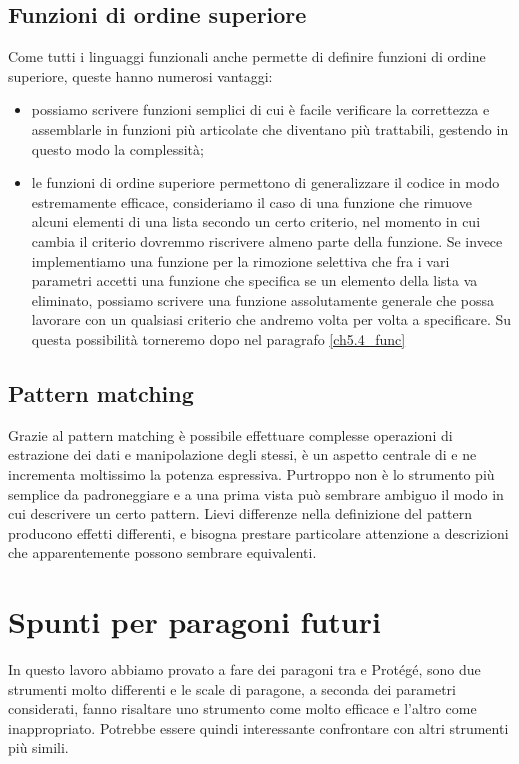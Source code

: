 \subsection{Funzioni di ordine superiore}
Come tutti i linguaggi funzionali anche \cduce permette di definire funzioni di ordine superiore, queste hanno numerosi vantaggi: 
\begin{itemize}
	\item possiamo scrivere funzioni semplici di cui è facile verificare la correttezza e assemblarle in funzioni più articolate che diventano più trattabili, gestendo in questo modo la complessità;
	\item le funzioni di ordine superiore permettono di generalizzare il codice in modo estremamente efficace, consideriamo il caso di una funzione che rimuove alcuni elementi di una lista secondo un certo criterio, nel momento in cui cambia il criterio dovremmo riscrivere almeno parte della funzione. Se invece implementiamo una funzione per la rimozione selettiva che fra i vari parametri accetti una funzione che specifica se un elemento della lista va eliminato, possiamo scrivere una funzione assolutamente generale che possa lavorare con un qualsiasi criterio che andremo volta per volta a specificare. Su questa possibilità torneremo dopo nel paragrafo \ref{ch5.4_func}
\end{itemize}
\subsection{Pattern matching}
Grazie al pattern matching è possibile effettuare complesse operazioni di estrazione dei dati e manipolazione degli stessi, è un aspetto centrale di \cduce e ne incrementa moltissimo la potenza espressiva. Purtroppo non è lo strumento più semplice da padroneggiare e a una prima vista può sembrare ambiguo il modo in cui descrivere un certo pattern. Lievi differenze nella definizione del pattern producono effetti differenti, e bisogna prestare particolare attenzione a descrizioni che apparentemente possono sembrare equivalenti.
\section{Spunti per paragoni futuri}
In questo lavoro abbiamo provato a fare dei paragoni tra \cduce e Protégé, sono due strumenti molto differenti e le scale di paragone, a seconda dei parametri considerati, fanno risaltare uno strumento come molto efficace e l'altro come inappropriato. Potrebbe essere quindi interessante confrontare \cduce con altri strumenti più simili.
